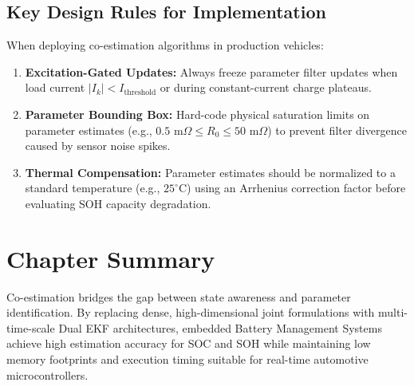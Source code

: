\subsection{Key Design Rules for Implementation}
When deploying co-estimation algorithms in production vehicles:
\begin{enumerate}
    \item \textbf{Excitation-Gated Updates:} Always freeze parameter filter updates when load current $|I_k| < I_{\text{threshold}}$ or during constant-current charge plateaus.
    \item \textbf{Parameter Bounding Box:} Hard-code physical saturation limits on parameter estimates (e.g., $0.5\text{ m}\Omega \le R_0 \le 50\text{ m}\Omega$) to prevent filter divergence caused by sensor noise spikes.
    \item \textbf{Thermal Compensation:} Parameter estimates should be normalized to a standard temperature (e.g., $25^\circ\text{C}$) using an Arrhenius correction factor before evaluating SOH capacity degradation.
\end{enumerate}

\section{Chapter Summary}
\label{sec:ch7_summary}
Co-estimation bridges the gap between state awareness and parameter identification. By replacing dense, high-dimensional joint formulations with multi-time-scale Dual EKF architectures, embedded Battery Management Systems achieve high estimation accuracy for SOC and SOH while maintaining low memory footprints and execution timing suitable for real-time automotive microcontrollers.
